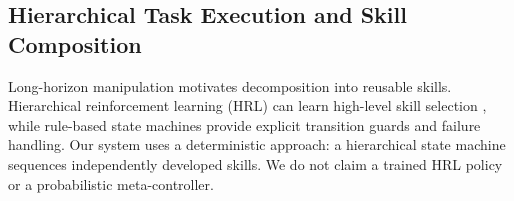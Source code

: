\subsection{Hierarchical Task Execution and Skill Composition}
Long-horizon manipulation motivates decomposition into reusable skills. Hierarchical reinforcement learning (HRL) can learn high-level skill selection \cite{pateria2021hierarchical}, while rule-based state machines provide explicit transition guards and failure handling. Our system uses a deterministic approach: a hierarchical state machine sequences independently developed skills. We do not claim a trained HRL policy or a probabilistic meta-controller.
